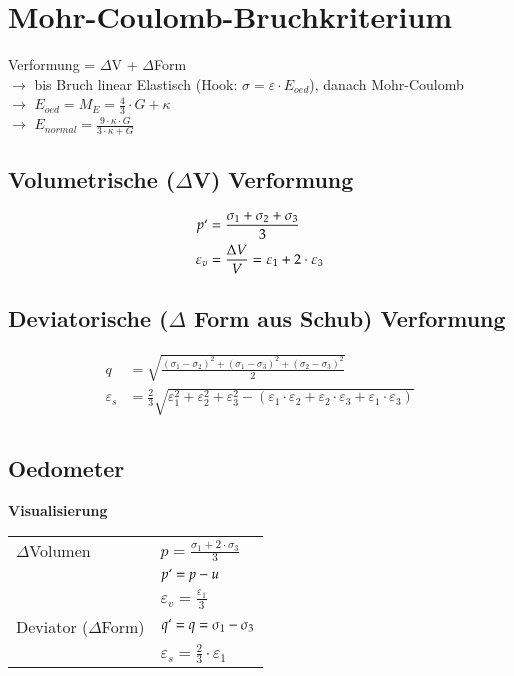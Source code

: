 \section{Mohr-Coulomb-Bruchkriterium}
	\begin{minipage}{\linewidth}
	Verformung = $\Delta$V + $\Delta$Form \\
	$\rightarrow$ bis Bruch linear Elastisch (Hook: $\sigma = \varepsilon \cdot E_{oed}$), danach Mohr-Coulomb \\
	\qquad $\rightarrow$ $E_{oed} = M_E = \frac{4}{3} \cdot G + \kappa$ \\
	\qquad $\rightarrow$ $E_{normal} = \frac{9 \cdot \kappa \cdot G}{3 \cdot \kappa + G}$



\subsection{Volumetrische ($\Delta$V) Verformung}
	\begin{align*}
		p`				&= \frac{\sigma_1 + \sigma_2 + \sigma_3}{3}	 \\
		\varepsilon_v	&= \frac{\Delta V}{V} = \varepsilon_1 + 2 \cdot \varepsilon_3 \\
	\end{align*}
	
\subsection{Deviatorische ($\Delta$ Form aus Schub) Verformung}
	\begin{align*}
		q				&= \sqrt{\frac{(\sigma_1 - \sigma_2)^2 + (\sigma_1 - \sigma_3)^2 + (\sigma_2 - \sigma_3)^2}{2}} \\
		\varepsilon_s	&= \frac{2}{3} \sqrt{\varepsilon_1^2 + \varepsilon_2^2 + \varepsilon_3^2 - (\varepsilon_1 \cdot \varepsilon_2 + \varepsilon_2 \cdot \varepsilon_3 + \varepsilon_1 \cdot \varepsilon_3)} \\
	\end{align*}
	
	
	
\subsection{Oedometer}
	\textbf{Visualisierung}
	\begin{tabular}{ll}
		$\Delta$Volumen		& $p= \frac{\sigma_1 + 2 \cdot \sigma_3}{3}$ \\
							& $p`= p - u$ \\
							& $\varepsilon_v= \frac{\varepsilon_1}{3}$ \\
		Deviator ($\Delta$Form) &$q`= q = \sigma_1 - \sigma_3$ \\
							& $\varepsilon_s= \frac{2}{3} \cdot \varepsilon_1$ \\
	\end{tabular}
	\end{minipage}


